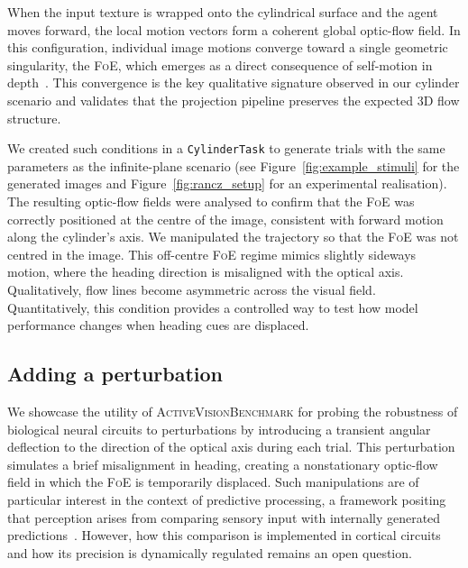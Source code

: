 \documentclass[12pt,a4paper]{article}
\newcommand{\avb}{\textsc{ActiveVisionBenchmark}}  %
\newcommand{\FoE}{\textsc{FoE}}  %
\begin{document}
When the input texture is wrapped onto the cylindrical surface and the agent moves forward, the local motion vectors form a coherent global optic-flow field. In this configuration, individual image motions converge toward a single geometric singularity, the \FoE{}, which emerges as a direct consequence of self-motion in depth~\parencite{DuffyWurtz1991}. This convergence is the key qualitative signature observed in our cylinder scenario and validates that the projection pipeline preserves the expected 3D flow structure.

We created such conditions in a \texttt{CylinderTask} to generate trials with the same parameters as the infinite-plane scenario (see Figure~\ref{fig:example_stimuli} for the generated images and Figure~\ref{fig:rancz_setup} for an experimental realisation). The resulting optic-flow fields were analysed to confirm that the \FoE{} was correctly positioned at the centre of the image, consistent with forward motion along the cylinder's axis. We manipulated the trajectory so that the \FoE{} was not centred in the image. This off-centre \FoE{} regime mimics slightly sideways motion, where the heading direction is misaligned with the optical axis. Qualitatively, flow lines become asymmetric across the visual field. Quantitatively, this condition provides a controlled way to test how model performance changes when heading cues are displaced.

\subsection{Adding a perturbation}
\label{subsec:perturbation}

We showcase the utility of \avb{} for probing the robustness of biological neural circuits to perturbations by introducing a transient angular deflection to the direction of the optical axis during each trial. This perturbation simulates a brief misalignment in heading, creating a nonstationary optic-flow field in which the \FoE{} is temporarily displaced. Such manipulations are of particular interest in the context of predictive processing, a framework positing that perception arises from comparing sensory input with internally generated predictions~\parencite{Spratling2017,KellerMrsicFlogel2018}. However, how this comparison is implemented in cortical circuits and how its precision is dynamically regulated remains an open question.
\end{document}
